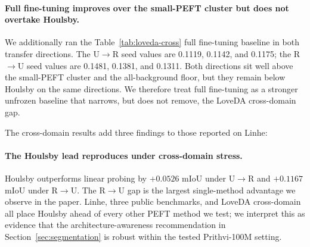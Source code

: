 \paragraph{Full fine-tuning improves over the small-PEFT cluster but does not overtake Houlsby.} We additionally ran the Table~\ref{tab:loveda-cross} full fine-tuning baseline in both transfer directions. The U$\rightarrow$R seed values are 0.1119, 0.1142, and 0.1175; the R$\rightarrow$U seed values are 0.1481, 0.1381, and 0.1311. Both directions sit well above the small-PEFT cluster and the all-background floor, but they remain below Houlsby on the same directions. We therefore treat full fine-tuning as a stronger unfrozen baseline that narrows, but does not remove, the LoveDA cross-domain gap.

The cross-domain results add three findings to those reported on Linhe:

\paragraph{The Houlsby lead reproduces under cross-domain stress.} Houlsby outperforms linear probing by $+0.0526$ mIoU under U$\rightarrow$R and $+0.1167$ mIoU under R$\rightarrow$U. The R$\rightarrow$U gap is the largest single-method advantage we observe in the paper. Linhe, three public benchmarks, and LoveDA cross-domain all place Houlsby ahead of every other PEFT method we test; we interpret this as evidence that the architecture-awareness recommendation in Section~\ref{sec:segmentation} is robust within the tested Prithvi-100M setting.

